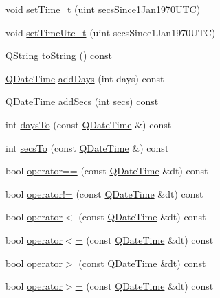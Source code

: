 \begin{DoxyCompactItemize}
void \mbox{\hyperlink{class_q_date_time_a889dac98cb29b4b9f33cfea6f00db98b}{set\+Time\+\_\+t}} (uint secs\+Since1\+Jan1970\+U\+TC)
\item 
void \mbox{\hyperlink{class_q_date_time_a9230e2178c9706ae658df2fd7d255b55}{set\+Time\+Utc\+\_\+t}} (uint secs\+Since1\+Jan1970\+U\+TC)
\item 
\mbox{\hyperlink{class_q_string}{Q\+String}} \mbox{\hyperlink{class_q_date_time_a5455d25292813109f21c15888552c5c9}{to\+String}} () const
\item 
\mbox{\hyperlink{class_q_date_time}{Q\+Date\+Time}} \mbox{\hyperlink{class_q_date_time_adeea3cac98a8c074fecf486094a9bbaf}{add\+Days}} (int days) const
\item 
\mbox{\hyperlink{class_q_date_time}{Q\+Date\+Time}} \mbox{\hyperlink{class_q_date_time_a7b48ae870775460aec8791465c2e5056}{add\+Secs}} (int secs) const
\item 
int \mbox{\hyperlink{class_q_date_time_a80a194c8ecef4133a9bff3aeb4546934}{days\+To}} (const \mbox{\hyperlink{class_q_date_time}{Q\+Date\+Time}} \&) const
\item 
int \mbox{\hyperlink{class_q_date_time_a3b697a289865bc96bd339acaa75880b3}{secs\+To}} (const \mbox{\hyperlink{class_q_date_time}{Q\+Date\+Time}} \&) const
\item 
bool \mbox{\hyperlink{class_q_date_time_a87f22ca0d6fa4b650dd32e1a4382219b}{operator==}} (const \mbox{\hyperlink{class_q_date_time}{Q\+Date\+Time}} \&dt) const
\item 
bool \mbox{\hyperlink{class_q_date_time_ac13d8b9af844ce2bf5f0bc8f3ca39499}{operator!=}} (const \mbox{\hyperlink{class_q_date_time}{Q\+Date\+Time}} \&dt) const
\item 
bool \mbox{\hyperlink{class_q_date_time_a9dc563b5ecdf98f1a5423efaf9e10073}{operator$<$}} (const \mbox{\hyperlink{class_q_date_time}{Q\+Date\+Time}} \&dt) const
\item 
bool \mbox{\hyperlink{class_q_date_time_aed7547e356368920d4faddba79084b10}{operator$<$=}} (const \mbox{\hyperlink{class_q_date_time}{Q\+Date\+Time}} \&dt) const
\item 
bool \mbox{\hyperlink{class_q_date_time_a41e0c1af2b40f5161b9c673ebaf8f8f0}{operator$>$}} (const \mbox{\hyperlink{class_q_date_time}{Q\+Date\+Time}} \&dt) const
\item 
bool \mbox{\hyperlink{class_q_date_time_afa796237c21386fc7034216c3846919f}{operator$>$=}} (const \mbox{\hyperlink{class_q_date_time}{Q\+Date\+Time}} \&dt) const
\end{DoxyCompactItemize}
